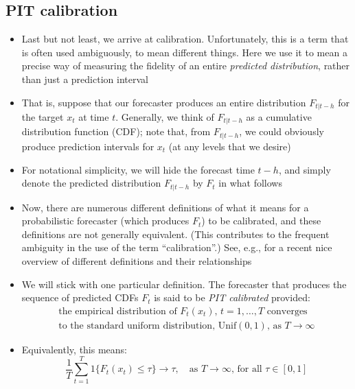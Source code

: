 \documentclass{article}
\begin{document}
\subsection{PIT calibration}

\begin{itemize}
\item Last but not least, we arrive at calibration. Unfortunately, this is a
  term that is often used ambiguously, to mean different things. Here we use  it
  to mean a precise way of measuring the fidelity of an entire \emph{predicted
    distribution}, rather than just a prediction interval  

\item That is, suppose that our forecaster produces an entire distribution
  $F_{t|t-h}$ for the target $x_t$ at time $t$. Generally, we think of
  $F_{t|t-h}$ as a cumulative distribution function (CDF); note that, from
  $F_{t|t-h}$, we could obviously produce prediction intervals for $x_t$ (at any
  levels that we desire)

\item For notational simplicity, we will hide the forecast time $t-h$, and
  simply denote the predicted distribution $F_{t|t-h}$ by $F_t$ in what follows 

\item Now, there are numerous different definitions of what it means for a
  probabilistic forecaster (which produces $F_t$) to be calibrated, and these
  definitions are not generally equivalent. (This contributes to the frequent
  ambiguity in the use of the term ``calibration''.) See, e.g.,
  \citet{gneiting2023regression} for a recent nice overview of different
  definitions and their relationships

\item We will stick with one particular definition. The forecaster that produces
  the sequence of predicted CDFs $F_t$ is said to be \emph{PIT calibrated}
  provided:  
  \begin{multline*}
  \text{the empirical distribution of $F_t(x_t)$, $t = 1,\dots,T$ converges} \\ 
  \text{to the standard uniform distribution, $\mathrm{Unif}(0,1)$, as $T \to
  \infty$} 
  \end{multline*}

\item Equivalently, this means:  
  \[
  \frac{1}{T} \sum_{t=1}^T 1\{ F_t(x_t) \leq \tau \} \to \tau, \quad \text{as $T
    \to \infty$, for all $\tau \in [0,1]$} 
  \]


\end{itemize}
\end{document}
